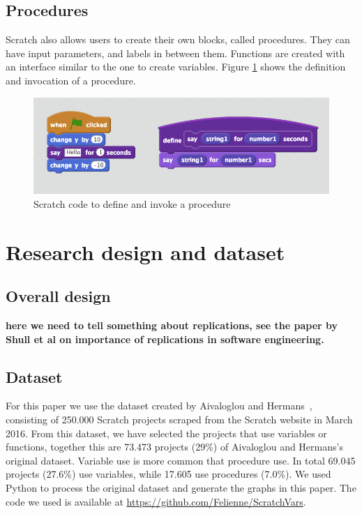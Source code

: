 \documentclass[conference]{IEEEtran}
\newcommand{\todo}[1]{ \textbf{#1} }
\begin{document}
\subsection{Procedures}
Scratch also allows users to create their own blocks, called procedures. They can have input parameters, and labels in between them. Functions are created with an interface similar to the one to create variables. Figure \ref{fig:functions} shows the definition and invocation of a procedure.

\begin{figure}
  \begin{center}
  \includegraphics[width=\columnwidth]{fig/functions.png}
  \caption{Scratch code to define and invoke a procedure}
  \label{fig:functions}
  \end{center}
\end{figure} 


\section{Research design and dataset}
\subsection{Overall design}
\todo{here we need to tell something about replications, see the paper by Shull et al on importance of replications in software engineering.}

\subsection{Dataset}
For this paper we use the dataset created by Aivaloglou and Hermans~\cite{Aivaloglou2016HowKC}, consisting of 250.000 Scratch projects scraped from the Scratch website in March 2016. From this dataset, we have selected the projects that use variables or functions, together this are 73.473 projects (29\%) of Aivaloglou and Hermans's original dataset. Variable use is more common that procedure use. In total 69.045 projects (27.6\%) use variables, while 17.605 use procedures (7.0\%). We used Python to process the original dataset and generate the graphs in this paper. The code we used is available at \url{https://github.com/Felienne/ScratchVars}.
\end{document}
